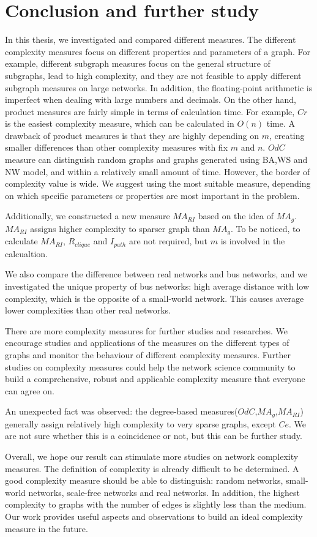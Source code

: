 \documentclass[12pt]{article}
\begin{document}
\section{Conclusion and further study}
In this thesis, we investigated and compared different measures. The different complexity measures focus on different properties and parameters of a graph. For example, different subgraph measures focus on the general structure of subgraphs, lead to high complexity, and they are not feasible to apply different subgraph measures on large networks. In addition, the floating-point arithmetic is imperfect when dealing with large numbers and decimals.
On the other hand, product measures are fairly simple in terms of calculation time. For example, $Cr$ is the easiest complexity measure, which can be calculated in $O(n)$ time\cite{KIM20082637}. A drawback of product measures is that they are highly depending on $m$, creating smaller differences than other complexity measures with fix $m$ and $n$.
$OdC$ measure can distinguish random graphs and graphs generated using BA,WS and NW model, and within a relatively small amount of time. However, the border of complexity value is wide. We suggest using the most suitable measure, depending on which specific parameters or properties are most important in the problem.\par
Additionally, we constructed a new measure $MA_{RI}$ based on the idea of $MA_g$. $MA_{RI}$ assigns higher complexity to sparser graph than $MA_g$. To be noticed, to calculate $MA_{RI}$, $R_{clique}$ and $I_{path}$ are not required, but $m$ is involved in the calcualtion.\par
We also compare the difference between real networks and bus networks, and we investigated the unique property of bus networks: high average distance with low complexity, which is the opposite of a small-world network. This causes average lower complexities than other real networks.\par
There are more complexity measures \cite{emmert-streib_dehmer_2012}\cite{dehmer_barbarini_varmuza_graber_2009} for further studies and researches. We encourage studies and applications of the measures on the different types of graphs and monitor the behaviour of different complexity measures. Further studies on complexity measures could help the network science community to build a comprehensive, robust and applicable complexity measure that everyone can agree on.\par
An unexpected fact was observed: the degree-based measures($OdC$,$MA_g$,$MA_{RI}$) generally assign relatively high complexity to very sparse graphs, except $Ce$. We are not sure whether this is a coincidence or not, but this can be further study.\par
Overall, we hope our result can stimulate more studies on network complexity measures. The definition of complexity is already difficult to be determined. A good complexity measure should be able to distinguish: random networks, small-world networks, scale-free networks and real networks. In addition, the highest complexity to graphs with the number of edges is slightly less than the medium. Our work provides useful aspects and observations to build an ideal complexity measure in the future.
\end{document}
